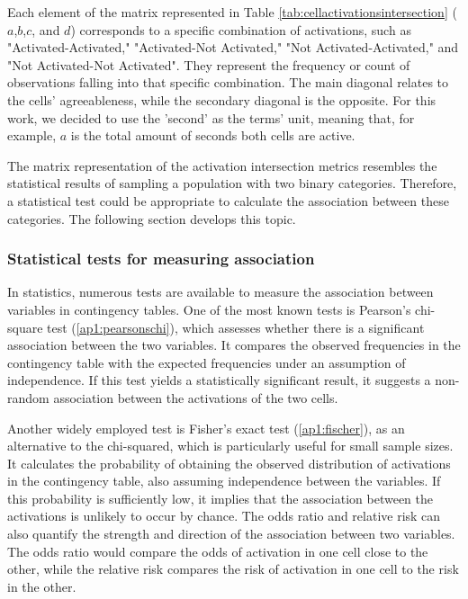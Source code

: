 Each element of the matrix represented in Table \ref{tab:cellactivationsintersection} ($a$,$b$,$c$, and $d$) corresponds to a specific combination of activations, such as "Activated-Activated," "Activated-Not Activated," "Not Activated-Activated," and "Not Activated-Not Activated". They represent the frequency or count of observations falling into that specific combination. The main diagonal relates to the cells' agreeableness, while the secondary diagonal is the opposite. For this work, we decided to use the 'second' as the terms' unit, meaning that, for example, $a$ is the total amount of seconds both cells are active.

The matrix representation of the activation intersection metrics resembles the statistical results of sampling a population with two binary categories. Therefore, a statistical test could be appropriate to calculate the association between these categories. The following section develops this topic.

\subsubsection{Statistical tests for measuring association}

In statistics, numerous tests are available to measure the association between variables in contingency tables. One of the most known tests is Pearson's chi-square test (\ref{ap1:pearsonschi}), which assesses whether there is a significant association between the two variables. It compares the observed frequencies in the contingency table with the expected frequencies under an assumption of independence. If this test yields a statistically significant result, it suggests a non-random association between the activations of the two cells.

Another widely employed test is Fisher's exact test (\ref{ap1:fischer}), as an alternative to the chi-squared, which is particularly useful for small sample sizes. It calculates the probability of obtaining the observed distribution of activations in the contingency table, also assuming independence between the variables. If this probability is sufficiently low, it implies that the association between the activations is unlikely to occur by chance. The odds ratio and relative risk can also quantify the strength and direction of the association between two variables. The odds ratio would compare the odds of activation in one cell close to the other, while the relative risk compares the risk of activation in one cell to the risk in the other.


